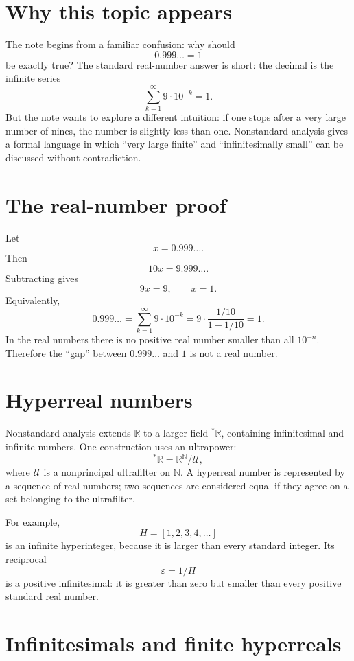 
\section{Why this topic appears}

The note begins from a familiar confusion: why should
\[
  0.999\ldots=1
\]
be exactly true?  The standard real-number answer is short: the decimal is the infinite series
\[
  \sum_{k=1}^{\infty}9\cdot10^{-k}=1.
\]
But the note wants to explore a different intuition: if one stops after a very large number of nines, the number is slightly less than one.  Nonstandard analysis gives a formal language in which “very large finite” and “infinitesimally small” can be discussed without contradiction.

\section{The real-number proof}

Let
\[
  x=0.999\ldots.
\]
Then
\[
  10x=9.999\ldots.
\]
Subtracting gives
\[
  9x=9,
  \qquad
  x=1.
\]
Equivalently,
\[
  0.999\ldots=\sum_{k=1}^{\infty}9\cdot10^{-k}
  =9\cdot \frac{1/10}{1-1/10}=1.
\]
In the real numbers there is no positive real number smaller than all $10^{-n}$.  Therefore the “gap” between $0.999\ldots$ and $1$ is not a real number.

\section{Hyperreal numbers}

Nonstandard analysis extends $\mathbb R$ to a larger field $^*\mathbb R$, containing infinitesimal and infinite numbers.  One construction uses an ultrapower:
\[
  {}^*\mathbb R=\mathbb R^{\mathbb N}/\mathcal U,
\]
where $\mathcal U$ is a nonprincipal ultrafilter on $\mathbb N$.  A hyperreal number is represented by a sequence of real numbers; two sequences are considered equal if they agree on a set belonging to the ultrafilter.

For example,
\[
  H=[1,2,3,4,\ldots]
\]
is an infinite hyperinteger, because it is larger than every standard integer.  Its reciprocal
\[
  \varepsilon=1/H
\]
is a positive infinitesimal: it is greater than zero but smaller than every positive standard real number.

\section{Infinitesimals and finite hyperreals}

